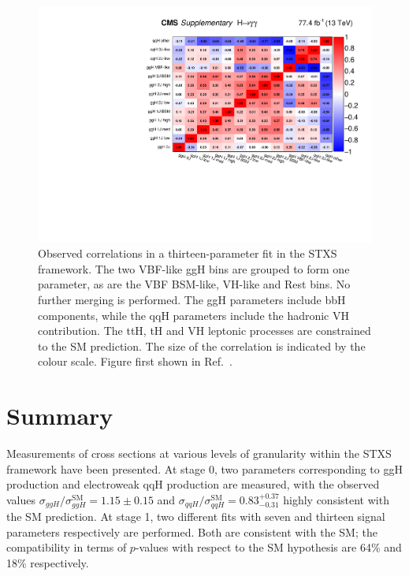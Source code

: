 \begin{figure}[hptb]
  \centering
  \includegraphics[width=\textwidth]{Figures/Results/CorrStage1Min.pdf}
  \caption[Observed correlations in a thirteen-parameter fit in the STXS framework.]
  {
    Observed correlations in a thirteen-parameter fit in the STXS framework. 
    The two VBF-like ggH bins are grouped to form one parameter, 
    as are the VBF BSM-like, VH-like and Rest bins. 
    No further merging is performed. 
    The ggH parameters include bbH components,
    while the qqH parameters include the hadronic VH contribution. 
    The ttH, tH and VH leptonic processes are constrained to the SM prediction. 
    The size of the correlation is indicated by the colour scale.
    Figure first shown in Ref.~\cite{HIG-18-029}.
  }
  \label{fig:results_CorrStage1Min}
\end{figure}

\clearpage

\section{Summary}

Measurements of cross sections at various levels of granularity within the STXS framework 
have been presented.
At stage 0, two parameters corresponding to ggH production and electroweak qqH production are measured, 
with the observed values $\sigma_{ggH}/\sigma_{ggH}^{\textrm{SM}} = 1.15 \pm 0.15$ 
and $\sigma_{qqH}/\sigma_{qqH}^{\textrm{SM}} = 0.83_{-0.31}^{+0.37}$ 
highly consistent with the SM prediction.
At stage 1, two different fits with seven and thirteen signal parameters respectively are performed.
Both are consistent with the SM; the compatibility in terms of $p$-values with respect to the SM
hypothesis are 64\% and 18\% respectively.


